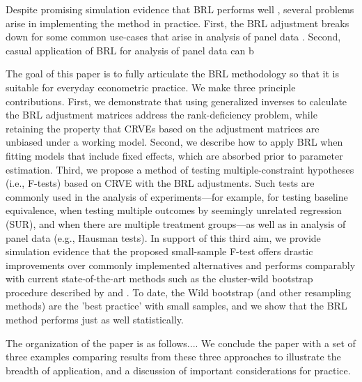 \documentclass[12pt]{article}\usepackage[]{graphicx}\usepackage[]{color}
\begin{document}
Despite promising simulation evidence that BRL performs well \citep[e.g.,][]{Imbens2012robust}, several problems arise in implementing the method in practice. 
First, the BRL adjustment breaks down for some common use-cases that arise in analysis of panel data \citep{Angrist2009mostly}. 
Second, casual application of BRL for analysis of panel data can b 

The goal of this paper is to fully articulate the BRL methodology so that it is suitable for everyday econometric practice. We make three principle contributions. 
First, we demonstrate that using generalized inverses to calculate the BRL adjustment matrices address the rank-deficiency problem, while retaining the property that CRVEs based on the adjustment matrices are unbiased under a working model. 
Second, we describe how to apply BRL when fitting models that include fixed effects, which are absorbed prior to parameter estimation. 
Third, we propose a method of testing multiple-constraint hypotheses (i.e., F-tests) based on CRVE with the BRL adjustments. 
Such tests are commonly used in the analysis of experiments---for example, for testing baseline equivalence, when testing multiple outcomes by seemingly unrelated regression (SUR), and when there are multiple treatment groups---as well as in analysis of panel data (e.g., Hausman tests). 
In support of this third aim, we provide simulation evidence that the proposed small-sample F-test offers drastic improvements over commonly implemented alternatives and performs comparably with current state-of-the-art methods such as the cluster-wild bootstrap procedure described by \citet{Cameron2008bootstrap} and \citet{Webb2013wild}. To date, the Wild bootstrap (and other resampling methods) are the 'best practice' with small samples, and we show that the BRL method performs just as well statistically.

The organization of the paper is as follows....
We conclude the paper with a set of three examples comparing results from these three approaches to illustrate the breadth of application, and a discussion of important considerations for practice.  

\end{document}
